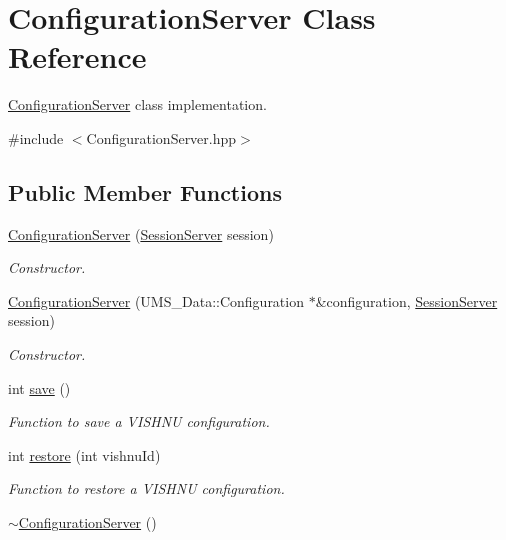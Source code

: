 \hypertarget{classConfigurationServer}{
\section{ConfigurationServer Class Reference}
\label{classConfigurationServer}
}


\hyperlink{classConfigurationServer}{ConfigurationServer} class implementation.  




{\ttfamily \#include $<$ConfigurationServer.hpp$>$}

\subsection*{Public Member Functions}
\begin{DoxyCompactItemize}
\item 
\hyperlink{classConfigurationServer_a56576161624c4cb62b332079efc733b9}{ConfigurationServer} (\hyperlink{classSessionServer}{SessionServer} session)
\begin{DoxyCompactList}\small\item\em Constructor. \item\end{DoxyCompactList}\item 
\hyperlink{classConfigurationServer_a0d37dc5d1d5a5e865f2a28b83fa60840}{ConfigurationServer} (UMS\_\-Data::Configuration $\ast$\&configuration, \hyperlink{classSessionServer}{SessionServer} session)
\begin{DoxyCompactList}\small\item\em Constructor. \item\end{DoxyCompactList}\item 
int \hyperlink{classConfigurationServer_a7d414b228146e93359137729e0dc7c08}{save} ()
\begin{DoxyCompactList}\small\item\em Function to save a VISHNU configuration. \item\end{DoxyCompactList}\item 
int \hyperlink{classConfigurationServer_ad77b3755e8b45cd283c6047c36a8a921}{restore} (int vishnuId)
\begin{DoxyCompactList}\small\item\em Function to restore a VISHNU configuration. \item\end{DoxyCompactList}\item 
\hypertarget{classConfigurationServer_af1c4ad2e0b6be6c2d44beaffe0eb9ec8}{
\hyperlink{classConfigurationServer_af1c4ad2e0b6be6c2d44beaffe0eb9ec8}{$\sim$ConfigurationServer} ()}
\label{classConfigurationServer_af1c4ad2e0b6be6c2d44beaffe0eb9ec8}


\end{DoxyCompactItemize}
